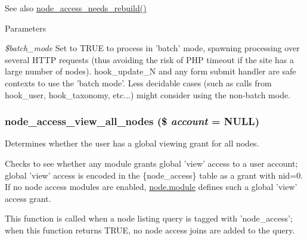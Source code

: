 \begin{DoxySeeAlso}{See also}
\hyperlink{group__node__access_ga895d95595168709334c4eca1472c6d23}{node\_\-access\_\-needs\_\-rebuild()}
\end{DoxySeeAlso}

\begin{DoxyParams}{Parameters}
\item[{\em \$batch\_\-mode}]Set to TRUE to process in 'batch' mode, spawning processing over several HTTP requests (thus avoiding the risk of PHP timeout if the site has a large number of nodes). hook\_\-update\_\-N and any form submit handler are safe contexts to use the 'batch mode'. Less decidable cases (such as calls from hook\_\-user, hook\_\-taxonomy, etc...) might consider using the non-\/batch mode. \end{DoxyParams}
\hypertarget{group__node__access_gafb79200147d5087ceb32cb6b0632afd4}{
\subsubsection[{node\_\-access\_\-view\_\-all\_\-nodes}]{\setlength{\rightskip}{0pt plus 5cm}node\_\-access\_\-view\_\-all\_\-nodes (\$ {\em account} = {\ttfamily NULL})}}
\label{group__node__access_gafb79200147d5087ceb32cb6b0632afd4}
Determines whether the user has a global viewing grant for all nodes.

Checks to see whether any module grants global 'view' access to a user account; global 'view' access is encoded in the \{node\_\-access\} table as a grant with nid=0. If no node access modules are enabled, \hyperlink{node_8module}{node.module} defines such a global 'view' access grant.

This function is called when a node listing query is tagged with 'node\_\-access'; when this function returns TRUE, no node access joins are added to the query.



